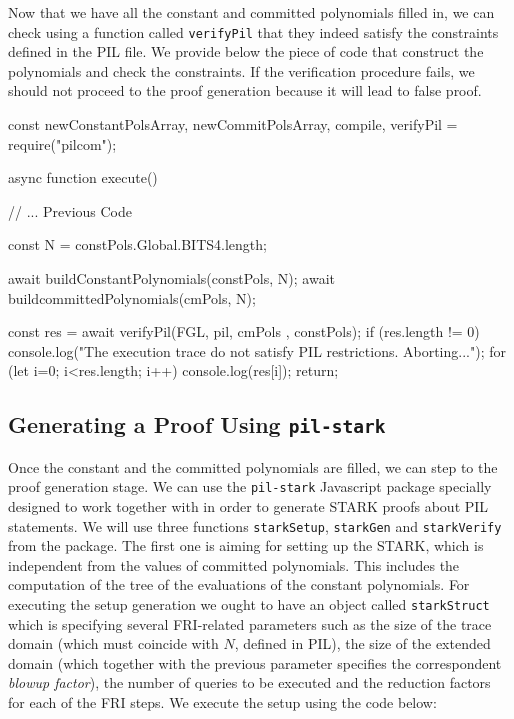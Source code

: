 Now that we have all the constant and committed polynomials filled in, we can check using a function called \texttt{verifyPil} that they indeed satisfy the constraints defined in the PIL file. We provide below the piece of code that construct the polynomials and check the constraints. If the verification procedure fails, we should not proceed to the proof generation because it will lead to false proof. 
\begin{js}
const { newConstantPolsArray, newCommitPolsArray, compile, verifyPil } = require("pilcom");
    
async function execute() {
    
    // ... Previous Code	
    
    const N = constPols.Global.BITS4.length;
        
    await buildConstantPolynomials(constPols, N);
    await buildcommittedPolynomials(cmPols, N);
    
    const res =  await verifyPil(FGL, pil, cmPols , constPols);
    if (res.length != 0) {
        console.log("The execution trace do not satisfy PIL restrictions. Aborting...");
        for (let i=0; i<res.length; i++) {
            console.log(res[i]);
            return;
        }
    }
}
\end{js}







\subsection{Generating a Proof Using \texttt{pil-stark}}

Once the constant and the committed polynomials are filled, we can step to the proof generation stage. We can use the \texttt{pil-stark} Javascript package specially designed to work together with \pilcom in order to generate STARK proofs about PIL statements. We will use three functions \texttt{starkSetup}, \texttt{starkGen} and \texttt{starkVerify} from the package. The first one is aiming for setting up the STARK, which is independent from the values of committed polynomials. This includes the computation of the tree of the evaluations of the constant polynomials. For executing the setup generation we ought to have an object called \texttt{starkStruct} which is specifying several FRI-related parameters such as the size of the trace domain (which must coincide with $N$, defined in PIL), the size of the extended domain (which together with the previous parameter specifies the correspondent \textit{blowup factor}), the number of queries to be executed and the reduction factors for each of the FRI steps. We execute the setup using the code below:

